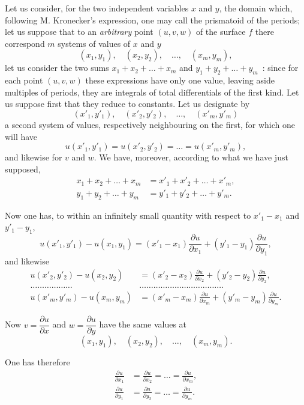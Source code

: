 \documentclass{article}
\begin{document}
Let us consider, for the two independent variables $x$ and $y$, the domain which, following M. Kronecker's expression, one may call the prismatoid of the periods; let us suppose that to an \emph{arbitrary} point $(u, v, w)$ of the surface $f$ there correspond $m$ systems of values of $x$ and $y$
\[
(x_{1}, y_{1}), \quad (x_{2}, y_{2}), \quad \ldots, \quad (x_{m}, y_{m}),
\]
let us consider the two sums $x_{1} + x_{2} + \ldots + x_{m}$ and $y_{1} + y_{2} + \ldots + y_{m}$~: since for each point $(u, v, w)$ these expressions have only one value, leaving aside multiples of periods, they are integrals of total differentials of the first kind. Let us suppose first that they reduce to constants. Let us designate by
\[
(x'_{1}, y'_{1}), \quad (x'_{2}, y'_{2}), \quad \ldots, \quad (x'_{m}, y'_{m})
\]
a second system of values, respectively neighbouring on the first, for which one will have
\[
u(x'_{1}, y'_{1}) = u(x'_{2}, y'_{2}) = \ldots = u(x'_{m}, y'_{m}),
\]
and likewise for $v$ and $w$. We have, moreover, according to what we have just supposed,
\[
\begin{aligned}
x_{1} + x_{2} + \ldots + x_{m} &= x'_{1} + x'_{2} + \ldots + x'_{m}, \\
y_{1} + y_{2} + \ldots + y_{m} &= y'_{1} + y'_{2} + \ldots + y'_{m}.
\end{aligned}
\tag{2}
\]

Now one has, to within an infinitely small quantity with respect to $x'_{1} - x_{1}$ and $y'_{1} - y_{1}$,
\[
u(x'_{1}, y'_{1}) - u(x_{1}, y_{1}) = (x'_{1} - x_{1})\frac{\partial u}{\partial x_{1}} + (y'_{1} - y_{1})\frac{\partial u}{\partial y_{1}},
\]
and likewise
\[
\begin{aligned}
u(x'_{2}, y'_{2}) - u(x_{2}, y_{2}) &= (x'_{2} - x_{2})\frac{\partial u}{\partial x_{2}} + (y'_{2} - y_{2})\frac{\partial u}{\partial y_{2}}, \\
\ldots\ldots\ldots\ldots\ldots\ldots &\ldots\ldots\ldots\ldots\ldots\ldots\ldots\ldots\ldots\ldots\ldots\ldots \\
u(x'_{m}, y'_{m}) - u(x_{m}, y_{m}) &= (x'_{m} - x_{m})\frac{\partial u}{\partial x_{m}} + (y'_{m} - y_{m})\frac{\partial u}{\partial y_{m}}.
\end{aligned}
\]

Now $v = \dfrac{\partial u}{\partial x}$ and $w = \dfrac{\partial u}{\partial y}$ have the same values at
\[
(x_{1}, y_{1}), \quad (x_{2}, y_{2}), \quad \ldots, \quad (x_{m}, y_{m}).
\]

One has therefore
\[
\begin{aligned}
\frac{\partial u}{\partial x_{1}} &= \frac{\partial u}{\partial x_{2}} = \ldots = \frac{\partial u}{\partial x_{m}}, \\
\frac{\partial u}{\partial y_{1}} &= \frac{\partial u}{\partial y_{2}} = \ldots = \frac{\partial u}{\partial y_{m}}.
\end{aligned}
\tag{3}
\]
\end{document}
